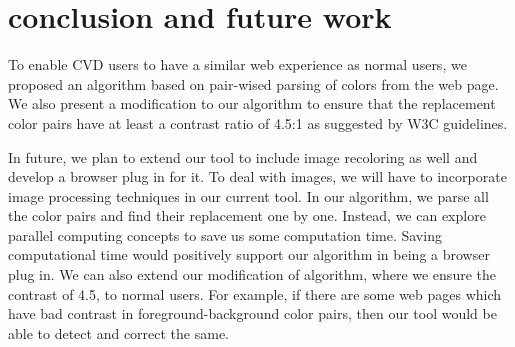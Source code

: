 \chapter{conclusion and future work}
\thispagestyle{plain}

\label{Conclusion and future work}

To enable CVD users to have a similar web experience as normal users, we proposed an algorithm based on pair-wised parsing of colors from the web page. We also present a modification to our algorithm to ensure that the replacement color pairs have at least a contrast ratio of 4.5:1 as suggested by W3C guidelines.

In future, we plan to extend our tool to include image recoloring as well and develop a browser plug in for it. To deal with images, we will have to incorporate image processing techniques in our current tool. In our algorithm, we parse all the color pairs and find their replacement one by one. Instead, we can explore parallel computing concepts to save us some computation time. Saving computational time would positively support our algorithm in being a browser plug in. We can also extend our modification of algorithm, where we ensure the contrast of 4.5, to normal users. For example, if there are some web pages which have bad contrast in foreground-background color pairs, then our tool would be able to detect and correct the same.   